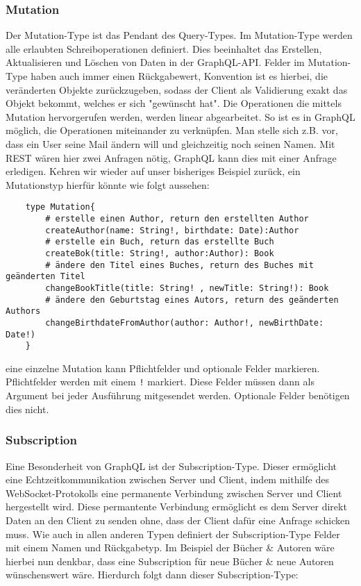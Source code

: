 \subsubsection{Mutation}

Der Mutation-Type ist das Pendant des Query-Types. Im Mutation-Type werden alle erlaubten Schreiboperationen definiert.
Dies beeinhaltet das Erstellen, Aktualisieren und Löschen von Daten in der GraphQL-API.
Felder im Mutation-Type haben auch immer einen Rückgabewert, Konvention ist es hierbei, die veränderten Objekte zurückzugeben,
sodass der Client als Validierung exakt das Objekt bekommt, welches er sich "gewünscht hat".
Die Operationen die mittels Mutation hervorgerufen werden, werden linear abgearbeitet. So ist es in GraphQL möglich, die
Operationen miteinander zu verknüpfen. Man stelle sich z.B. vor, dass ein User seine Mail ändern will und gleichzeitig noch
seinen Namen. Mit REST wären hier zwei Anfragen nötig, GraphQL kann dies mit einer Anfrage erledigen.
Kehren wir wieder auf unser bisheriges Beispiel zurück, ein Mutationstyp hierfür könnte wie folgt aussehen:

\begin{verbatim}
    type Mutation{
        # erstelle einen Author, return den erstellten Author
        createAuthor(name: String!, birthdate: Date):Author
        # erstelle ein Buch, return das erstellte Buch
        createBok(title: String!, author:Author): Book
        # ändere den Titel eines Buches, return des Buches mit geänderten Titel
        changeBookTitle(title: String! , newTitle: String!): Book
        # ändere den Geburtstag eines Autors, return des geänderten Authors
        changeBirthdateFromAuthor(author: Author!, newBirthDate: Date!)
    }
\end{verbatim}

eine einzelne Mutation kann Pflichtfelder und optionale Felder markieren.
Pflichtfelder werden mit einem \verb+!+ markiert.
Diese Felder müssen dann als Argument bei jeder Ausführung mitgesendet werden.
Optionale Felder benötigen dies nicht.

\subsubsection{Subscription}

Eine Besonderheit von GraphQL ist der Subscription-Type.
Dieser ermöglicht eine Echtzeitkommunikation zwischen Server und Client, indem mithilfe des WebSocket-Protokolls eine
permanente Verbindung zwischen Server und Client hergestellt wird.
Diese permantente Verbindung ermöglicht es dem Server direkt Daten an den Client zu senden ohne, dass der Client dafür
eine Anfrage schicken muss.
Wie auch in allen anderen Typen definiert der Subscription-Type Felder mit einem Namen und Rückgabetyp.
Im Beispiel der Bücher & Autoren wäre hierbei nun denkbar, dass eine Subscription für neue Bücher & neue Autoren wünschenswert
wäre.
Hierdurch folgt dann dieser Subscription-Type:

